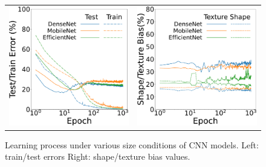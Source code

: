 \begin{figure}[htb]
\centering
   \begin{tabular}{cc}
      \includegraphics[keepaspectratio, width=0.45\linewidth]{fig/cnn_model_learning_curv.pdf} &
       \hspace{5pt} 
      \includegraphics[keepaspectratio, width=0.45\linewidth]{fig/cnn_model_sha_tex.pdf}
   \end{tabular}
\caption[Learning process under various size conditions of CNN models.]{Learning process under various size conditions of CNN models. Left: train/test errors Right: shape/texture bias values.}
\label{fig:comp_cnn_model}
\end{figure}

\begin{table}[htb]
    \centering
    \caption{
    Correlation coefficients and scores in Phase 1, 2 and Phase 3 for different CNN models.
    }
    \label{tab:corr_CNN_model}
\end{table}

